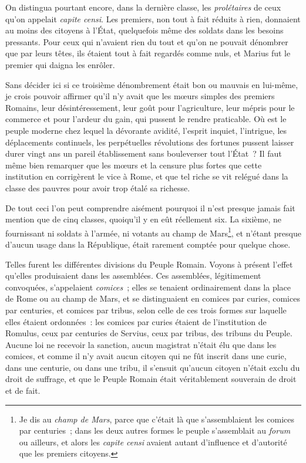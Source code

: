 \documentclass[french,twoside]{book} %
\begin{document}
On distingua pourtant encore, dans la dernière classe, les {\itshape prolétaires} de ceux qu’on appelait {\itshape capite censi}. Les premiers, non tout à fait réduits à rien, donnaient au moins des citoyens à l’État, quelquefois même des soldats dans les besoins pressants. Pour ceux qui n’avaient rien du tout et qu’on ne pouvait dénombrer que par leurs têtes, ils étaient tout à fait regardés comme nuls, et Marius fut le premier qui daigna les enrôler.\par
Sans décider ici si ce troisième dénombrement était bon ou mauvais en lui-même, je crois pouvoir affirmer qu’il n’y avait que les mœurs simples des premiers Romains, leur désintéressement, leur goût pour l’agriculture, leur mépris pour le commerce et pour l’ardeur du gain, qui pussent le rendre praticable. Où est le peuple moderne chez lequel la dévorante avidité, l’esprit inquiet, l’intrigue, les déplacements continuels, les perpétuelles révolutions des fortunes pussent laisser durer vingt ans un pareil établissement sans bouleverser tout l’État ? Il faut même bien remarquer que les mœurs et la censure plus fortes que cette institution en corrigèrent le vice à Rome, et que tel riche se vit relégué dans la classe des pauvres pour avoir trop étalé sa richesse.\par
De tout ceci l’on peut comprendre aisément pourquoi il n’est presque jamais fait mention que de cinq classes, quoiqu’il y en eût réellement six. La sixième, ne fournissant ni soldats à l’armée, ni votants au champ de Mars\footnote{Je dis au {\itshape champ de Mars}, parce que c’était là que s’assemblaient les comices par centuries ; dans les deux autres formes le peuple s’assemblait au {\itshape forum} ou ailleurs, et alors les {\itshape capite censi} avaient autant d’influence et d’autorité que les premiers citoyens.}, et n’étant presque d’aucun usage dans la République, était rarement comptée pour quelque chose.\par
Telles furent les différentes divisions du Peuple Romain. Voyons à présent l’effet qu’elles produisaient dans les assemblées. Ces assemblées, légitimement convoquées, s’appelaient {\itshape comices} ; elles se tenaient ordinairement dans la place de Rome ou au champ de Mars, et se distinguaient en comices par curies, comices par centuries, et comices par tribus, selon celle de ces trois formes sur laquelle elles étaient ordonnées : les comices par curies étaient de l’institution de Romulus, ceux par centuries de Servius, ceux par tribus, des tribuns du Peuple. Aucune loi ne recevoir la sanction, aucun magistrat n’était élu que dans les comices, et comme il n’y avait aucun citoyen qui ne fût inscrit dans une curie, dans une centurie, ou dans une tribu, il s’ensuit qu’aucun citoyen n’était exclu du droit de suffrage, et que le Peuple Romain était véritablement souverain de droit et de fait.\par
\end{document}
